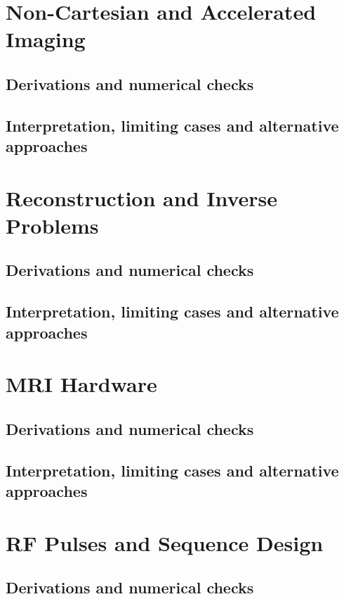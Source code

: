 \section{Non-Cartesian and Accelerated Imaging}
\label{sec:e:non-cartesian-and-accelerated-imaging}
\subsection{Derivations and numerical checks}
\subsection{Interpretation, limiting cases and alternative approaches}
\par\pagebreak[1]

\section{Reconstruction and Inverse Problems}
\label{sec:e:reconstruction-and-inverse-problems}
\subsection{Derivations and numerical checks}
\subsection{Interpretation, limiting cases and alternative approaches}
\par\pagebreak[1]

\section{MRI Hardware}
\label{sec:e:mri-hardware}
\subsection{Derivations and numerical checks}
\subsection{Interpretation, limiting cases and alternative approaches}
\par\pagebreak[1]

\section{RF Pulses and Sequence Design}
\label{sec:e:rf-pulses-and-sequence-design}
\subsection{Derivations and numerical checks}
